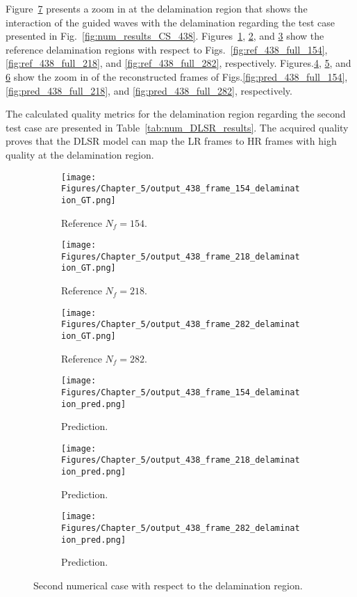 Figure~\ref{fig:num_results_CS_damage_area_438} presents a zoom in at the delamination region that shows the interaction of the guided waves with the delamination regarding the test case presented in Fig.~\ref{fig:num_results_CS_438}.
Figures~\ref{fig:ref_438_damage_154}, \ref{fig:ref_438_damage_218}, and \ref{fig:ref_438_damage_282} show the reference delamination regions with respect to Figs.~\ref{fig:ref_438_full_154}, \ref{fig:ref_438_full_218}, and \ref{fig:ref_438_full_282}, respectively.
Figures.\ref{fig:pred_438_damage_154}, \ref{fig:pred_438_damage_218}, and \ref{fig:pred_438_damage_282} show the zoom in of the reconstructed frames of Figs.\ref{fig:pred_438_full_154}, \ref{fig:pred_438_full_218}, and \ref{fig:pred_438_full_282}, respectively.

The calculated quality metrics for the delamination region regarding the second test case are presented in Table~\ref{tab:num_DLSR_results}.
The acquired quality proves that the DLSR model can map the LR frames to HR frames with high quality at the delamination region.
\begin{figure} [!ht]
	\centering
	\begin{subfigure}[b]{.32\textwidth}
		\centering
		\texttt{[image: Figures/Chapter\_5/output\_438\_frame\_154\_delamination\_GT.png]}
		\caption{Reference $N_f=154$.}
		\label{fig:ref_438_damage_154}
	\end{subfigure}
	\begin{subfigure}[b]{.32\textwidth}
		\centering
		\texttt{[image: Figures/Chapter\_5/output\_438\_frame\_218\_delamination\_GT.png]}
		\caption{Reference $N_f=218$.}
		\label{fig:ref_438_damage_218}
	\end{subfigure}
	\begin{subfigure}[b]{.32\textwidth}
		\centering
		\texttt{[image: Figures/Chapter\_5/output\_438\_frame\_282\_delamination\_GT.png]}
		\caption{Reference $N_f=282$.}
		\label{fig:ref_438_damage_282}	
	\end{subfigure}
	\begin{subfigure}[b]{.32\textwidth}
		\centering
		\texttt{[image: Figures/Chapter\_5/output\_438\_frame\_154\_delamination\_pred.png]}
		\caption{Prediction.}
		\label{fig:pred_438_damage_154}
	\end{subfigure}
	\begin{subfigure}[b]{.32\textwidth}
		\centering
		\texttt{[image: Figures/Chapter\_5/output\_438\_frame\_218\_delamination\_pred.png]}
		\caption{Prediction.}
		\label{fig:pred_438_damage_218}
	\end{subfigure}
	\begin{subfigure}[b]{.32\textwidth}
		\centering
		\texttt{[image: Figures/Chapter\_5/output\_438\_frame\_282\_delamination\_pred.png]}
		\caption{Prediction.}
		\label{fig:pred_438_damage_282}	
	\end{subfigure}
	\caption{Second numerical case with respect to the delamination region.}
	\label{fig:num_results_CS_damage_area_438}
\end{figure}


